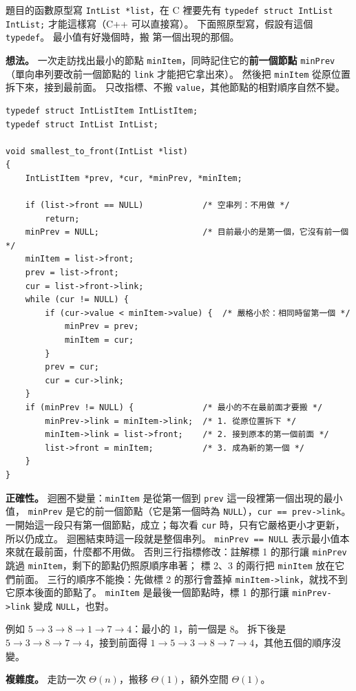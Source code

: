 \begin{pastsoln}
題目的函數原型寫 \texttt{IntList *list}，在 C 裡要先有 \texttt{typedef struct IntList IntList;}
才能這樣寫（C++ 可以直接寫）。 下面照原型寫，假設有這個 \texttt{typedef}。 最小值有好幾個時，搬
第一個出現的那個。

\textbf{想法。} 一次走訪找出最小的節點 \texttt{minItem}，同時記住它的\textbf{前一個節點}
\texttt{minPrev}（單向串列要改前一個節點的 \texttt{link} 才能把它拿出來）。 然後把 \texttt{minItem}
從原位置拆下來，接到最前面。 只改指標、不搬 \texttt{value}，其他節點的相對順序自然不變。
\begin{verbatim}
typedef struct IntListItem IntListItem;
typedef struct IntList IntList;

void smallest_to_front(IntList *list)
{
    IntListItem *prev, *cur, *minPrev, *minItem;

    if (list->front == NULL)            /* 空串列：不用做 */
        return;
    minPrev = NULL;                     /* 目前最小的是第一個，它沒有前一個 */
    minItem = list->front;
    prev = list->front;
    cur = list->front->link;
    while (cur != NULL) {
        if (cur->value < minItem->value) {  /* 嚴格小於：相同時留第一個 */
            minPrev = prev;
            minItem = cur;
        }
        prev = cur;
        cur = cur->link;
    }
    if (minPrev != NULL) {              /* 最小的不在最前面才要搬 */
        minPrev->link = minItem->link;  /* 1. 從原位置拆下 */
        minItem->link = list->front;    /* 2. 接到原本的第一個前面 */
        list->front = minItem;          /* 3. 成為新的第一個 */
    }
}
\end{verbatim}

\textbf{正確性。} 迴圈不變量：\texttt{minItem} 是從第一個到 \texttt{prev} 這一段裡第一個出現的最小值，
\texttt{minPrev} 是它的前一個節點（它是第一個時為 \texttt{NULL}），\texttt{cur == prev->link}。
一開始這一段只有第一個節點，成立；每次看 \texttt{cur} 時，只有它嚴格更小才更新，所以仍成立。
迴圈結束時這一段就是整個串列。 \texttt{minPrev == NULL} 表示最小值本來就在最前面，什麼都不用做。
否則三行指標修改：註解標 1 的那行讓 \texttt{minPrev} 跳過 \texttt{minItem}，剩下的節點仍照原順序串著；
標 2、3 的兩行把 \texttt{minItem} 放在它們前面。 三行的順序不能換：先做標 2 的那行會蓋掉
\texttt{minItem->link}，就找不到它原本後面的節點了。 \texttt{minItem} 是最後一個節點時，標 1 的那行讓
\texttt{minPrev->link} 變成 \texttt{NULL}，也對。

例如 $5 \to 3 \to 8 \to 1 \to 7 \to 4$：最小的 $1$，前一個是 $8$。 拆下後是
$5 \to 3 \to 8 \to 7 \to 4$，接到前面得 $1 \to 5 \to 3 \to 8 \to 7 \to 4$，其他五個的順序沒變。

\textbf{複雜度。} 走訪一次 $\Theta(n)$，搬移 $\Theta(1)$，額外空間 $\Theta(1)$。
\end{pastsoln}
